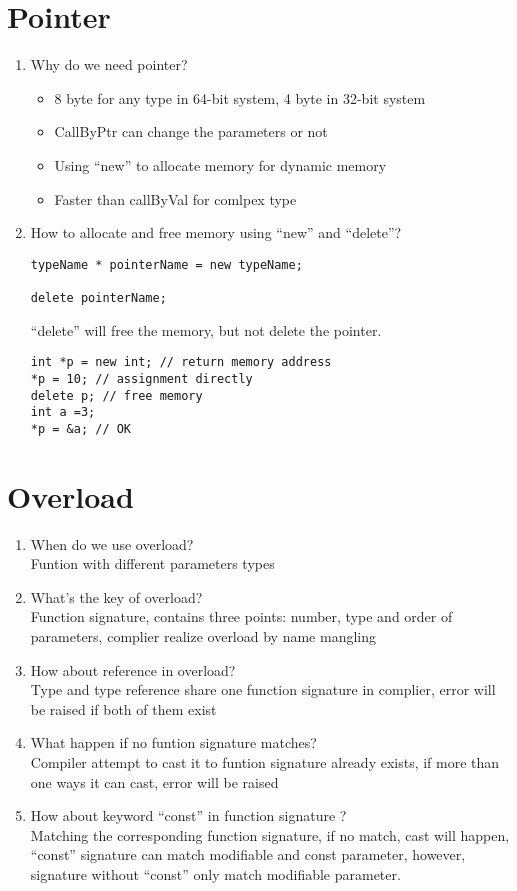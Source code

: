 \documentclass[10pt,a4paper,oneside]{article}
\begin{document}
\section{Pointer}
\begin{enumerate}[1.]
\item Why do we need pointer?
\begin{itemize}
\item 8 byte for any type in 64-bit system, 4 byte in 32-bit system
\item CallByPtr can change the parameters or not
\item Using ``new'' to allocate memory for dynamic memory
\item Faster than callByVal for comlpex type
\end{itemize}
\item How to allocate and free memory using ``new'' and ``delete''?\\
\begin{lstlisting}
typeName * pointerName = new typeName;

delete pointerName;
\end{lstlisting}
``delete'' will free the memory, but not delete the pointer.
\begin{lstlisting}
int *p = new int; // return memory address
*p = 10; // assignment directly
delete p; // free memory
int a =3;
*p = &a; // OK
\end{lstlisting}
\end{enumerate}
\section{Overload}
\begin{enumerate}[1.]
\item When do we use overload?\\
Funtion with different parameters types
\item What's the key of overload?\\
Function signature, contains three points: number, type and order of parameters, complier realize overload by name mangling
\item How about reference in overload?\\
Type and type reference share one function signature in complier, error will be raised if both of them exist
\item What happen if no funtion signature matches?\\
Compiler attempt to cast it to funtion signature already exists, if more than one ways it can cast, error will be raised
\item How about keyword ``const'' in function signature ?\\
Matching the corresponding function signature, if no match,  cast will happen, ``const'' signature can match modifiable and const parameter, however, signature without ``const'' only match modifiable parameter.
\end{enumerate}
\end{document}

